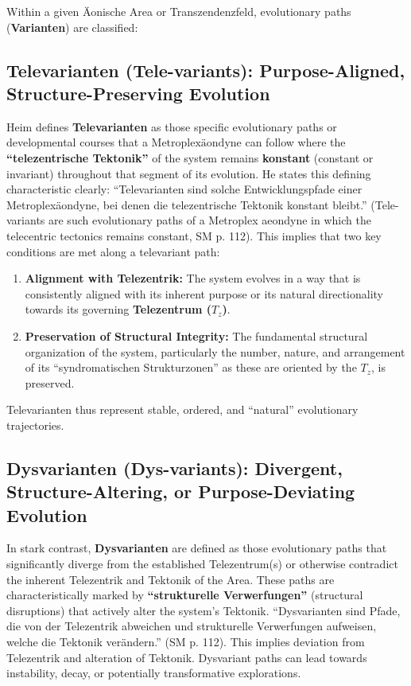 \documentclass[
    12pt,              %
    a4paper,           %
    headings=normal,   %
    twoside=true,      %
    BCOR=8mm,          %
]{scrbook}
\newcommand{\q}[1]{\enquote{#1}}
\newcommand{\metroplexaeondyne}{\text{Metroplexäondyne}}
\newcommand{\telezentrum}{T_z}
\begin{document}
Within a given Äonische Area or Transzendenzfeld, evolutionary paths (\textbf{Varianten}) are classified:

\subsection{Televarianten (Tele-variants): Purpose-Aligned, Structure-Preserving Evolution}
\label{sec:ch6_televarianten}
Heim defines \textbf{Televarianten} as those specific evolutionary paths or developmental courses that a \(\metroplexaeondyne\) can follow where the \textbf{\q{telezentrische Tektonik}} of the system remains \textbf{konstant} (constant or invariant) throughout that segment of its evolution. He states this defining characteristic clearly: \q{Televarianten sind solche Entwicklungspfade einer Metroplexäondyne, bei denen die telezentrische Tektonik konstant bleibt.} (Tele-variants are such evolutionary paths of a Metroplex aeondyne in which the telecentric tectonics remains constant, SM p. 112).
This implies that two key conditions are met along a televariant path:
\begin{enumerate}
    \item  \textbf{Alignment with Telezentrik:} The system evolves in a way that is consistently aligned with its inherent purpose or its natural directionality towards its governing \textbf{Telezentrum (\(\telezentrum\))}.
    \item  \textbf{Preservation of Structural Integrity:} The fundamental structural organization of the system, particularly the number, nature, and arrangement of its \q{syndromatischen Strukturzonen} as these are oriented by the \(\telezentrum\), is preserved.
\end{enumerate}
Televarianten thus represent stable, ordered, and \q{natural} evolutionary trajectories.

\subsection{Dysvarianten (Dys-variants): Divergent, Structure-Altering, or Purpose-Deviating Evolution}
\label{sec:ch6_dysvarianten}
In stark contrast, \textbf{Dysvarianten} are defined as those evolutionary paths that significantly diverge from the established Telezentrum(s) or otherwise contradict the inherent Telezentrik and Tektonik of the Area. These paths are characteristically marked by \textbf{\q{strukturelle Verwerfungen}} (structural disruptions) that actively alter the system’s Tektonik. \q{Dysvarianten sind Pfade, die von der Telezentrik abweichen und strukturelle Verwerfungen aufweisen, welche die Tektonik verändern.} (SM p. 112).
This implies deviation from Telezentrik and alteration of Tektonik. Dysvariant paths can lead towards instability, decay, or potentially transformative explorations.
\end{document}
